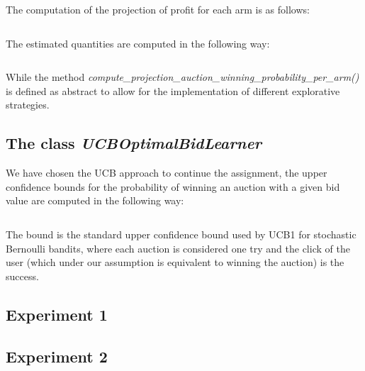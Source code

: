 \documentclass[11pt]{article} %
\begin{document}
The computation of the projection of profit for each arm is as follows:

\inputminted{python}{code/step5_projected_profit.py}

\begin{samepage}
The estimated quantities are computed in the following way:
\inputminted{python}{code/step5_estimated_quantities.py}
\end{samepage}
While the method \textit{compute\_projection\_auction\_winning\_probability\_per\_arm()} is defined as abstract to allow for the implementation of different explorative strategies.

\subsection{The class \textit{UCBOptimalBidLearner}}
We have chosen the UCB approach to continue the assignment, the upper confidence bounds for the probability of winning an auction with a given bid value are computed in the following way:

\inputminted{python}{code/step5_ucb_win_prob.py}

The bound is the standard upper confidence bound used by UCB1 for stochastic Bernoulli bandits, where each auction is considered one try and the click of the user (which under our assumption is equivalent to winning the auction) is the success.

\clearpage
\subsection{Experiment 1}

\clearpage

{\footnotesize}

\clearpage
\subsection{Experiment 2}

\clearpage

{\footnotesize}



\clearpage
\end{document}
